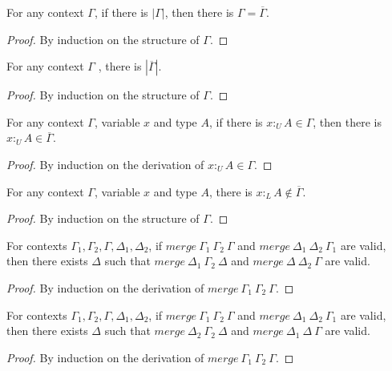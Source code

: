 \documentclass[sigplan,screen,review,anonymous]{acmart}
\newcommand{\pure}[1]{|#1|}
\newcommand{\utype}{:_{\scriptscriptstyle U}}
\newcommand{\ltype}{:_{\scriptscriptstyle L}}
\newcommand{\mrg}[3]{merge\ {#1}\ {#2}\ {#3}}
\begin{document}
\begin{lemma}\label{purere}
  For any context $\Gamma$, if there is $\pure{\Gamma}$, then there is $\Gamma = \overline{\Gamma}$.
\end{lemma}
\begin{proof}
  By induction on the structure of $\Gamma$.
\end{proof}

\begin{lemma}\label{repure}
  For any context $\Gamma$ , there is $\pure{\overline{\Gamma}}$.
\end{lemma}
\begin{proof}
  By induction on the structure of $\Gamma$.
\end{proof}

\begin{lemma}\label{hasure}
  For any context $\Gamma$, variable $x$ and type $A$, if there is $x \utype A \in \Gamma$, then there is $x \utype A \in \overline{\Gamma}$.
\end{lemma}
\begin{proof}
  By induction on the derivation of $x \utype A \in \Gamma$.
\end{proof}

\begin{lemma}\label{haslre}
  For any context $\Gamma$, variable $x$ and type $A$, there is $x \ltype A \notin \overline{\Gamma}$.
\end{lemma}
\begin{proof}
  By induction on the structure of $\Gamma$.
\end{proof}

\begin{lemma}\label{mergesplit1}
  For contexts $\Gamma_1, \Gamma_2, \Gamma, \Delta_1, \Delta_2$, if $\mrg{\Gamma_1}{\Gamma_2}{\Gamma}$ and $\mrg{\Delta_1}{\Delta_2}{\Gamma_1}$ are valid, then there exists $\Delta$ such that $\mrg{\Delta_1}{\Gamma_2}{\Delta}$ and $\mrg{\Delta}{\Delta_2}{\Gamma}$ are valid.
\end{lemma}
\begin{proof}
  By induction on the derivation of $\mrg{\Gamma_1}{\Gamma_2}{\Gamma}$.
\end{proof}

\begin{lemma}
  For contexts $\Gamma_1, \Gamma_2, \Gamma, \Delta_1, \Delta_2$, if $\mrg{\Gamma_1}{\Gamma_2}{\Gamma}$ and $\mrg{\Delta_1}{\Delta_2}{\Gamma_1}$ are valid, then there exists $\Delta$ such that $\mrg{\Delta_2}{\Gamma_2}{\Delta}$ and $\mrg{\Delta_1}{\Delta}{\Gamma}$ are valid.
\end{lemma}
\begin{proof}
  By induction on the derivation of $\mrg{\Gamma_1}{\Gamma_2}{\Gamma}$.
\end{proof}
\end{document}
